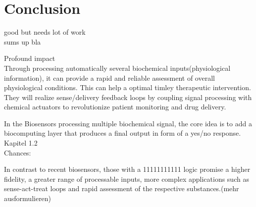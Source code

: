 \documentclass[runningheads]{llncs}
\begin{document}
\section{Conclusion}
	good but needs lot of work\\
	sums up bla
	
		Profound impact\\
	
	Through processing automatically several biochemical inputs(physiological information), it can provide a rapid and reliable assessment of overall physiological conditions. This can help a optimal timley therapeutic intervention. They will realize sense/delivery feedback loops by coupling signal processing with chemical actuators to revolutionize patient monitoring and drug delivery. 
	
	In the Biosensors processing multiple biochemical signal, the core idea is to add a biocomputing layer that produces a final output in form of a yes/no response. Kapitel 1.2\\
	
	Chances:
	
	
	
	
	In contrast to recent biosensors, those with a 11111111111 logic promise a higher fidelity, a greater range of processable inputs, more complex applications such as sense-act-treat loops and rapid assessment of the respective substances.(mehr ausformulieren)
	
	
	
	
\end{document}

